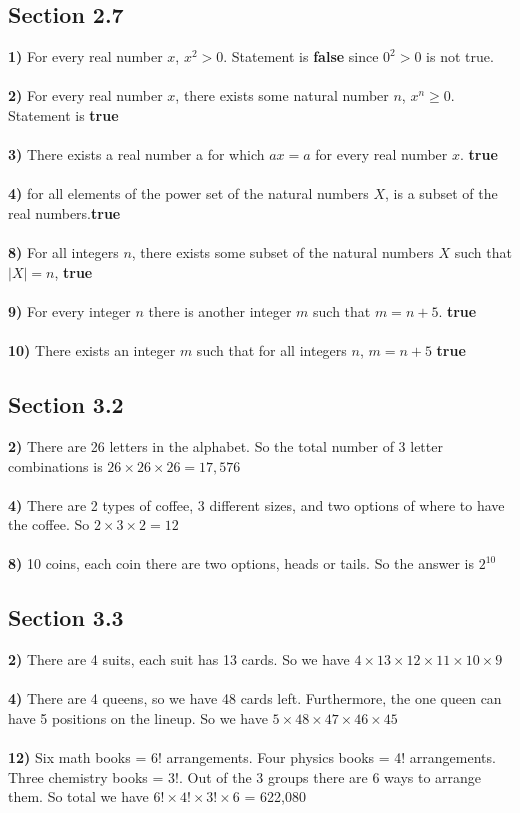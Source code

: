 \documentclass[12pt]{article}
\begin{document}
\subsection*{Section 2.7}
\textbf{1)} For every real number $x$, $x^2 > 0$. Statement is \textbf{false} since $0^2 > 0$ is not true.\\\\
\textbf{2)} For every real number $x$, there exists some natural number $n$, $x^{n} \geq 0$. Statement is \textbf{true}\\\\
\textbf{3)} There exists a real number a for which $ax = a$ for every real number $x$. \textbf{true}\\\\
\textbf{4)} for all elements of the power set of the natural numbers $X$, is a subset of the real numbers.\textbf{true}\\\\
\textbf{8)} For all integers $n$, there exists some subset of the natural numbers $X$ such that $|X| = n$, \textbf{true}\\\\
\textbf{9)} For every integer $n$ there is another integer $m$ such that $m = n + 5$. \textbf{true}\\\\
\textbf{10)} There exists an integer $m$ such that for all integers $n$, $m = n + 5$ \textbf{true}



\subsection*{Section 3.2}
\textbf{2)} There are 26 letters in the alphabet. So the total number of 3 letter combinations is $26 \times 26 \times 26 = 17,576$\\\\
\textbf{4)} There are 2 types of coffee, 3 different sizes, and two options of where to have the coffee. So $2 \times 3 \times 2 = 12$\\\\
\textbf{8)} 10 coins, each coin there are two options, heads or tails. So the answer is $2^{10}$



\subsection*{Section 3.3}
\textbf{2)} There are 4 suits, each suit has 13 cards. So we have $4 \times 13 \times 12 \times 11 \times 10 \times 9$\\\\
\textbf{4)} There are 4 queens, so we have 48 cards left. Furthermore, the one queen can  have 5 positions on the lineup. So we have $5 \times 48 \times 47 \times 46 \times 45$\\\\
\textbf{12)} Six math books = 6! arrangements. Four physics books = 4! arrangements. Three chemistry books = 3!. Out of the 3 groups there are 6 ways to arrange them. So total we have $6! \times 4! \times 3! \times 6$ = 622,080
\end{document}
